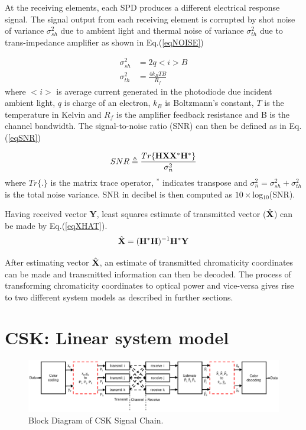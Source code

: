 \documentclass[10pt,letterpaper]{article}
\newcommand{\vm}[1]{{\bf{#1}}}
\begin{document}
At the receiving elements, each SPD produces a different electrical response signal. The signal output from each receiving element is corrupted by shot noise of variance $\sigma^{2}_{sh}$ due to ambient light and thermal noise of variance $\sigma^{2}_{th}$ due to trans-impedance amplifier as shown in Eq.(\ref{eqNOISE})

\begin{equation}
	\begin{aligned}
	\sigma^{2}_{sh} &= 2q<i>B\\
	\sigma^{2}_{th} &= \frac{4k_{B}TB}{R_{f}}
\end{aligned}
\label{eqNOISE}
\end{equation}
where $<i>$ is average current generated in the photodiode due incident ambient light, $q$ is charge of an electron, $k_{B}$ is Boltzmann's constant, $T$ is the temperature in Kelvin and $R_{f}$ is the amplifier feedback resistance and B is the channel bandwidth. The signal-to-noise ratio (SNR) can then be defined as in Eq.(\ref{eqSNR})

\begin{equation}
	SNR \triangleq \frac{Tr\{\vm{H}\vm{X}\vm{X}^{*}\vm{H}^{*}\}}{\sigma^{2}_{n}}
	\label{eqSNR}
\end{equation}
where $Tr\{.\}$ is the matrix trace operator, $^{*}$ indicates transpose and $\sigma^{2}_{n}=\sigma^{2}_{sh}+\sigma^{2}_{th}$ is the total noise variance. SNR in decibel is then computed as $10\times$log$_{10}$(SNR).

Having received vector \vm{Y}, least squares estimate of transmitted vector ($\hat{\vm{X}}$) can be made by Eq.(\ref{eqXHAT}).
\begin{equation}
	\hat{\vm{X}} = (\vm{H}^{*}\vm{H})^{-1}\vm{H}^{*}\vm{Y}
	\label{eqXHAT}
\end{equation}

After estimating vector $\hat{\vm{X}}$, an estimate of transmitted chromaticity coordinates can be made and transmitted information can then be decoded. The process of transforming chromaticity coordinates to optical power and vice-versa gives rise to two different system models as described in further sections.

\section{CSK: Linear system model}\label{sCSKL}

\begin{figure}[b]
	\centering
		\includegraphics[trim={2.34in 2.78in 1.76in 2.47in}, clip=true, width=5.25in]{CSKBlockDiagram.eps}
	\caption{Block Diagram of CSK Signal Chain.}
	\label{figCSKBD}
\end{figure}
\end{document}
